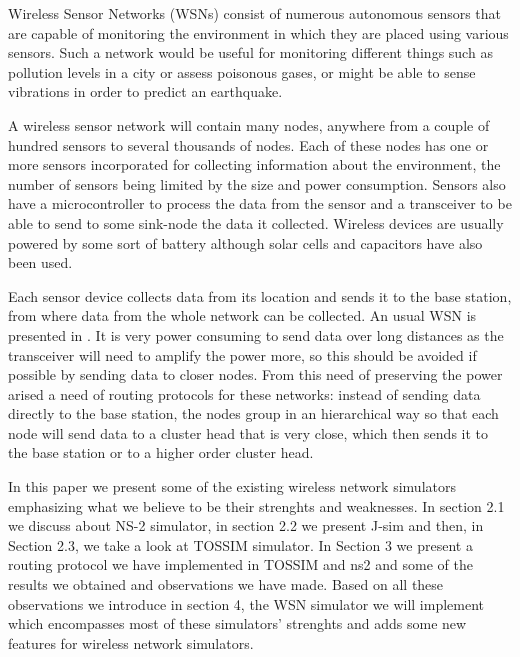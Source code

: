 
Wireless Sensor Networks (WSNs) consist of numerous autonomous sensors that are
capable of monitoring the environment in which they are placed using various
sensors. Such a network would be useful for monitoring different things such
as pollution levels
in a city or assess poisonous gases, or might be able to sense vibrations in order 
to predict an earthquake. 

A wireless sensor network will contain many nodes, anywhere from a couple of
hundred sensors to several thousands of nodes. Each of these nodes has one or
more sensors incorporated for collecting information about the environment, the number of
sensors being limited
by the size and power consumption. Sensors also have a microcontroller 
to process the data from the sensor and a transceiver to be able to send to some 
sink-node the data it collected. Wireless devices are usually powered by some sort of battery 
although solar cells and capacitors have also been used.

Each sensor device collects data from its location and sends it to the base station,
from where data from the whole network can be collected. An usual WSN is
presented in . It is very power
consuming to send data over long distances as the transceiver will need to
amplify the power more, so this should be avoided if possible by sending data to
closer nodes. From this need of preserving the power 
arised a need of routing protocols for these
networks: instead of sending data directly to the base station, the nodes
group in an hierarchical way so that each node will send data to a cluster
head that is very close, which then sends it to the base station or to a higher
order cluster head.


In this paper we present some of the existing wireless network
simulators emphasizing what we believe to be their strenghts and weaknesses. 
In section 2.1 we discuss about NS-2 simulator, in section 2.2 we present
J-sim and then, in Section 2.3,  we take a look at TOSSIM simulator.
In Section 3 we present a routing protocol we have implemented in TOSSIM and
ns2 and some of the results we obtained and observations we have made.
Based on all these observations
we introduce in section 4, the WSN simulator we will implement which
encompasses most of these simulators' strenghts and adds some new features
for wireless network simulators.
